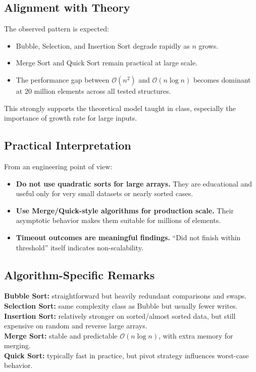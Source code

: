 \documentclass[12pt,a4paper]{article}
\begin{document}
\subsection{Alignment with Theory}
The observed pattern is expected:
\begin{itemize}
    \item Bubble, Selection, and Insertion Sort degrade rapidly as $n$ grows.
    \item Merge Sort and Quick Sort remain practical at large scale.
    \item The performance gap between $\mathcal{O}(n^2)$ and $\mathcal{O}(n \log n)$ becomes dominant at 20 million elements across all tested structures.
\end{itemize}

This strongly supports the theoretical model taught in class, especially the importance of growth rate for large inputs.

\subsection{Practical Interpretation}
From an engineering point of view:
\begin{itemize}
    \item \textbf{Do not use quadratic sorts for large arrays.} They are educational and useful only for very small datasets or nearly sorted cases.
    \item \textbf{Use Merge/Quick-style algorithms for production scale.} Their asymptotic behavior makes them suitable for millions of elements.
    \item \textbf{Timeout outcomes are meaningful findings.} ``Did not finish within threshold'' itself indicates non-scalability.
\end{itemize}

\subsection{Algorithm-Specific Remarks}
\textbf{Bubble Sort:} straightforward but heavily redundant comparisons and swaps.\\
\textbf{Selection Sort:} same complexity class as Bubble but usually fewer writes.\\
\textbf{Insertion Sort:} relatively stronger on sorted/almost sorted data, but still expensive on random and reverse large arrays.\\
\textbf{Merge Sort:} stable and predictable $\mathcal{O}(n \log n)$, with extra memory for merging.\\
\textbf{Quick Sort:} typically fast in practice, but pivot strategy influences worst-case behavior.
\end{document}
